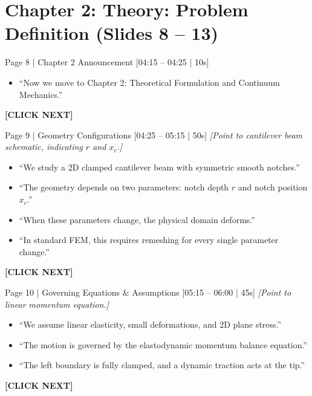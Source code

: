 \documentclass[9pt,a4paper]{article}
\begin{document}
\section*{Chapter 2: Theory: Problem Definition (Slides 8 -- 13)}

\begin{slidebox}{Page 8 | Chapter 2 Announcement \hfill [04:15 -- 04:25 | 10s]}
\begin{itemize}
  \item ``Now we move to Chapter 2: Theoretical Formulation and Continuum Mechanics.''
\end{itemize}
\textbf{\color{cnamred}[CLICK NEXT]}
\end{slidebox}

\begin{slidebox}{Page 9 | Geometry Configurations \hfill [04:25 -- 05:15 | 50s]}
\textit{[Point to cantilever beam schematic, indicating $r$ and $x_c$.]}
\begin{itemize}
  \item ``We study a 2D clamped cantilever beam with symmetric smooth notches.''
  \item ``The geometry depends on two parameters: notch depth $r$ and notch position $x_c$.''
  \item ``When these parameters change, the physical domain deforms.''
  \item ``In standard FEM, this requires remeshing for every single parameter change.''
\end{itemize}
\textbf{\color{cnamred}[CLICK NEXT]}
\end{slidebox}

\begin{slidebox}{Page 10 | Governing Equations \& Assumptions \hfill [05:15 -- 06:00 | 45s]}
\textit{[Point to linear momentum equation.]}
\begin{itemize}
  \item ``We assume linear elasticity, small deformations, and 2D plane stress.''
  \item ``The motion is governed by the elastodynamic momentum balance equation.''
  \item ``The left boundary is fully clamped, and a dynamic traction acts at the tip.''
\end{itemize}
\textbf{\color{cnamred}[CLICK NEXT]}
\end{slidebox}
\end{document}
